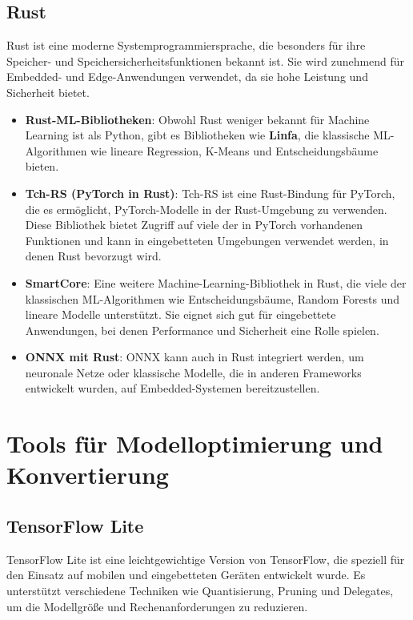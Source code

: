 \subsection{Rust}
Rust ist eine moderne Systemprogrammiersprache, die besonders für ihre Speicher- und Speichersicherheitsfunktionen bekannt ist. 
Sie wird zunehmend für Embedded- und Edge-Anwendungen verwendet, da sie hohe Leistung und Sicherheit bietet.

\begin{itemize}
    \item \textbf{Rust-ML-Bibliotheken}: Obwohl Rust weniger bekannt für Machine Learning ist als Python, gibt es Bibliotheken wie \textbf{Linfa}, 
    die klassische ML-Algorithmen wie lineare Regression, K-Means und Entscheidungsbäume bieten.

    \item \textbf{Tch-RS (PyTorch in Rust)}: Tch-RS ist eine Rust-Bindung für PyTorch, die es ermöglicht, PyTorch-Modelle in der Rust-Umgebung zu verwenden. 
    Diese Bibliothek bietet Zugriff auf viele der in PyTorch vorhandenen Funktionen und kann in eingebetteten Umgebungen verwendet werden, in denen Rust bevorzugt wird.

    \item \textbf{SmartCore}: Eine weitere Machine-Learning-Bibliothek in Rust, die viele der klassischen ML-Algorithmen wie Entscheidungsbäume, 
    Random Forests und lineare Modelle unterstützt. Sie eignet sich gut für eingebettete Anwendungen, bei denen Performance und Sicherheit eine Rolle spielen.

    \item \textbf{ONNX mit Rust}: ONNX kann auch in Rust integriert werden, um neuronale Netze oder klassische Modelle, die in anderen Frameworks entwickelt wurden, 
    auf Embedded-Systemen bereitzustellen.
\end{itemize}

\section{Tools für Modelloptimierung und Konvertierung}

\subsection{TensorFlow Lite}
TensorFlow Lite ist eine leichtgewichtige Version von TensorFlow, die speziell für den Einsatz auf mobilen und eingebetteten Geräten entwickelt wurde. 
Es unterstützt verschiedene Techniken wie Quantisierung, Pruning und Delegates, um die Modellgröße und Rechenanforderungen zu reduzieren.

